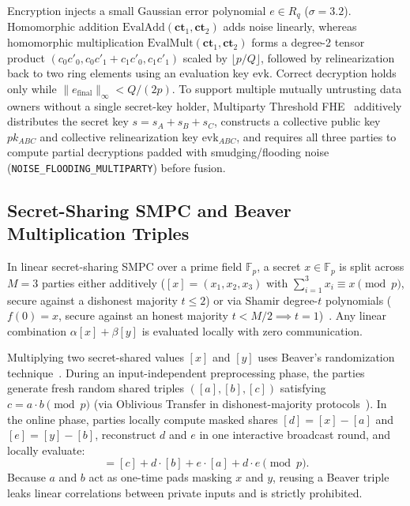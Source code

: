 \documentclass[conference]{IEEEtran}
\begin{document}
Encryption injects a small Gaussian error polynomial $e \in R_q$ ($\sigma = 3.2$). Homomorphic addition $\text{EvalAdd}(\mathbf{ct}_1, \mathbf{ct}_2)$ adds noise linearly, whereas homomorphic multiplication $\text{EvalMult}(\mathbf{ct}_1, \mathbf{ct}_2)$ forms a degree-2 tensor product $(c_0 c'_0, c_0 c'_1 + c_1 c'_0, c_1 c'_1)$ scaled by $\lfloor p/Q \rfloor$, followed by relinearization back to two ring elements using an evaluation key $\text{evk}$. Correct decryption holds only while $\|e_{\text{final}}\|_\infty < Q / (2p)$. To support multiple mutually untrusting data owners without a single secret-key holder, Multiparty Threshold FHE~\cite{mouchet2021} additively distributes the secret key $s = s_A + s_B + s_C$, constructs a collective public key $pk_{ABC}$ and collective relinearization key $\text{evk}_{ABC}$, and requires all three parties to compute partial decryptions padded with smudging/flooding noise (\texttt{NOISE\_FLOODING\_MULTIPARTY}) before fusion.

\subsection{Secret-Sharing SMPC and Beaver Multiplication Triples}
In linear secret-sharing SMPC over a prime field $\mathbb{F}_p$, a secret $x \in \mathbb{F}_p$ is split across $M=3$ parties either additively ($[x] = (x_1, x_2, x_3)$ with $\sum_{i=1}^3 x_i \equiv x \pmod p$, secure against a dishonest majority $t \le 2$) or via Shamir degree-$t$ polynomials ($f(0)=x$, secure against an honest majority $t < M/2 \implies t=1$)~\cite{shamir1979}. Any linear combination $\alpha [x] + \beta [y]$ is evaluated locally with zero communication.

Multiplying two secret-shared values $[x]$ and $[y]$ uses Beaver's randomization technique~\cite{beaver1991}. During an input-independent preprocessing phase, the parties generate fresh random shared triples $([a], [b], [c])$ satisfying $c = a \cdot b \pmod p$ (via Oblivious Transfer in dishonest-majority protocols~\cite{mascot2016}). In the online phase, parties locally compute masked shares $[d] = [x] - [a]$ and $[e] = [y] - [b]$, reconstruct $d$ and $e$ in one interactive broadcast round, and locally evaluate:
\begin{equation}
[x \cdot y] = [c] + d \cdot [b] + e \cdot [a] + d \cdot e \pmod p.
\end{equation}
Because $a$ and $b$ act as one-time pads masking $x$ and $y$, reusing a Beaver triple leaks linear correlations between private inputs and is strictly prohibited.
\end{document}
